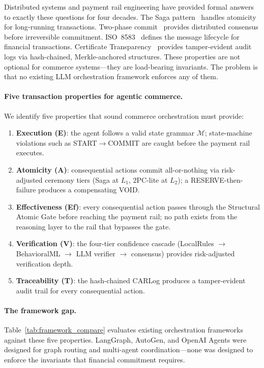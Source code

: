 \documentclass{article}
\begin{document}
Distributed systems and payment rail engineering have provided formal answers to exactly these questions for four decades. The Saga pattern~\cite{saga} handles atomicity for long-running transactions. Two-phase commit~\cite{2pc} provides distributed consensus before irreversible commitment. ISO~8583~\cite{iso8583} defines the message lifecycle for financial transactions. Certificate Transparency~\cite{ct} provides tamper-evident audit logs via hash-chained, Merkle-anchored structures. These properties are not optional for commerce systems---they are load-bearing invariants. The problem is that no existing LLM orchestration framework enforces any of them.

\paragraph{Five transaction properties for agentic commerce.} We identify five properties that sound commerce orchestration must provide:

\begin{enumerate}
\item \textbf{Execution (E)}: the agent follows a valid state grammar $\mathcal{M}$; state-machine violations such as START$\to$COMMIT are caught before the payment rail executes.
\item \textbf{Atomicity (A)}: consequential actions commit all-or-nothing via risk-adjusted ceremony tiers (Saga at $L_1$, 2PC-lite at $L_2$); a RESERVE-then-failure produces a compensating VOID.
\item \textbf{Effectiveness (Ef)}: every consequential action passes through the Structural Atomic Gate before reaching the payment rail; no path exists from the reasoning layer to the rail that bypasses the gate.
\item \textbf{Verification (V)}: the four-tier confidence cascade (LocalRules $\to$ BehavioralML $\to$ LLM verifier $\to$ consensus) provides risk-adjusted verification depth.
\item \textbf{Traceability (T)}: the hash-chained CARLog produces a tamper-evident audit trail for every consequential action.
\end{enumerate}

\paragraph{The framework gap.} Table~\ref{tab:framework_compare} evaluates existing orchestration frameworks against these five properties. LangGraph, AutoGen, and OpenAI Agents were designed for graph routing and multi-agent coordination---none was designed to enforce the invariants that financial commitment requires.
\end{document}
